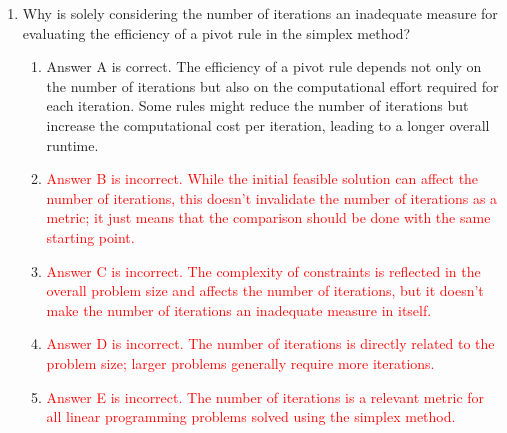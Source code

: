 \documentclass{article}%
\newcommand{\incorrect}[1]{\textcolor{red}{#1}}
\begin{document}
\begin{enumerate}
\begin{enumerate}
\item \incorrect{Answer B is incorrect. While the problem can be scaled to have many variables and constraints, the key factor is the shape of the feasible region, not simply the problem size.}%
\item Answer C is correct. The Klee-Minty problem is specifically constructed to have a highly skewed and elongated feasible region. This forces the simplex method, using certain pivot rules, to visit an exponential number of vertices before reaching the optimal solution.%
\item \incorrect{Answer D is incorrect. The constraints are designed to create a specific geometric structure, but correlation is not the primary cause of the exponential complexity.}%
\item \incorrect{Answer E is incorrect. The distance to the optimal solution is a factor in the overall runtime, but the highly skewed feasible region is the fundamental reason for the exponential behavior.}%
\end{enumerate}%
\vspace{1em}%
\item Why is solely considering the number of iterations an inadequate measure for evaluating the efficiency of a pivot rule in the simplex method?%
\begin{enumerate}%
\item Answer A is correct.  The efficiency of a pivot rule depends not only on the number of iterations but also on the computational effort required for each iteration. Some rules might reduce the number of iterations but increase the computational cost per iteration, leading to a longer overall runtime.%
\item \incorrect{Answer B is incorrect. While the initial feasible solution can affect the number of iterations, this doesn't invalidate the number of iterations as a metric; it just means that the comparison should be done with the same starting point.}%
\item \incorrect{Answer C is incorrect. The complexity of constraints is reflected in the overall problem size and affects the number of iterations, but it doesn't make the number of iterations an inadequate measure in itself.}%
\item \incorrect{Answer D is incorrect. The number of iterations is directly related to the problem size; larger problems generally require more iterations.}%
\item \incorrect{Answer E is incorrect. The number of iterations is a relevant metric for all linear programming problems solved using the simplex method.}%

\end{enumerate}
\end{enumerate}
\end{document}
